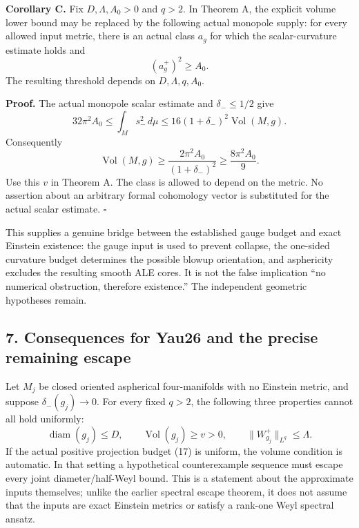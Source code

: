 \documentclass[
  11pt,
]{article}
\begin{document}
\textbf{Corollary C.} Fix \(D,\Lambda,A_0>0\) and \(q>2\). In Theorem A,
the explicit volume lower bound may be replaced by the following actual
monopole supply: for every allowed input metric, there is an actual
class \(a_g\) for which the scalar-curvature estimate holds and \[
                           (a_g^+)^2\ge A_0.             \tag{17}
\] The resulting threshold depends on \(D,\Lambda,q,A_0\).

\textbf{Proof.} The actual monopole scalar estimate and
\(\delta_-\le1/2\) give \[
 32\pi^2 A_0\le\int_M s_-^2\,d\mu
       \le16(1+\delta_-)^2\operatorname{Vol}(M,g).
\] Consequently \[
             \operatorname{Vol}(M,g)
                 \ge\frac{2\pi^2A_0}{(1+\delta_-)^2}
                 \ge\frac{8\pi^2A_0}{9}.               \tag{18}
\] Use this \(v\) in Theorem A. The class is allowed to depend on the
metric. No assertion about an arbitrary formal cohomology vector is
substituted for the actual scalar estimate. \(\square\)

This supplies a genuine bridge between the established gauge budget and
exact Einstein existence: the gauge input is used to prevent collapse,
the one-sided curvature budget determines the possible blowup
orientation, and asphericity excludes the resulting smooth ALE cores. It
is not the false implication ``no numerical obstruction, therefore
existence.'' The independent geometric hypotheses remain.

\hypertarget{consequences-for-yau26-and-the-precise-remaining-escape}{%
\subsection{7. Consequences for Yau26 and the precise remaining
escape}\label{consequences-for-yau26-and-the-precise-remaining-escape}}

Let \(M_j\) be closed oriented aspherical four-manifolds with no
Einstein metric, and suppose \(\delta_-(g_j)\to0\). For every fixed
\(q>2\), the following three properties cannot all hold uniformly: \[
 \operatorname{diam}(g_j)\le D,
 \qquad\operatorname{Vol}(g_j)\ge v>0,
 \qquad\|W^+_{g_j}\|_{L^q}\le\Lambda.                  \tag{19}
\] If the actual positive projection budget (17) is uniform, the volume
condition is automatic. In that setting a hypothetical counterexample
sequence must escape every joint diameter/half-Weyl bound. This is a
statement about the approximate inputs themselves; unlike the earlier
spectral escape theorem, it does not assume that the inputs are exact
Einstein metrics or satisfy a rank-one Weyl spectral ansatz.
\end{document}
